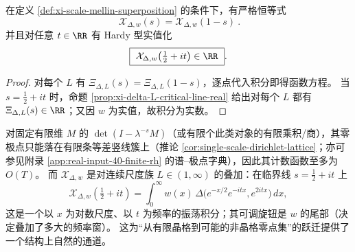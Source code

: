 \begin{proposition}[尺度叠加保持函数方程与临界线实值性]\label{prop:xi-scale-mellin-fe-real}
在定义 \ref{def:xi-scale-mellin-superposition} 的条件下，有严格恒等式
\[
\boxed{\ \mathcal X_{\Delta,w}(s)=\mathcal X_{\Delta,w}(1-s)\ }.
\]
并且对任意 \(t\in\RR\) 有 Hardy 型实值化
\[
\boxed{\ \mathcal X_{\Delta,w}\!\left(\tfrac12+it\right)\in\RR\ }.
\]
\end{proposition}
\begin{proof}
对每个 \(L\) 有 \(\Xi_{\Delta,L}(s)=\Xi_{\Delta,L}(1-s)\)，逐点代入积分即得函数方程。
当 \(s=\tfrac12+it\) 时，命题 \ref{prop:xi-delta-L-critical-line-real} 给出对每个 \(L\) 都有 \(\Xi_{\Delta,L}(s)\in\RR\)；又因 \(w\) 为实值，故积分为实数。
\end{proof}

\begin{remark}[动机：连续尺度混合打破有限竖向晶格刚性]\label{rem:xi-scale-mellin-break-lattice}
对固定有限维 \(M\) 的 \(\det(I-\lambda^{-s}M)\)（或有限个此类对象的有限乘积/商），其零极点只能落在有限条等差竖线簇上（推论 \ref{cor:single-scale-dirichlet-lattice}；亦可参见附录 \ref{app:real-input-40-finite-rh} 的谱--极点字典），因此其计数函数至多为 \(O(T)\)。
而 \(\mathcal X_{\Delta,w}\) 是对连续尺度族 \(L\in(1,\infty)\) 的叠加：在临界线 \(s=\tfrac12+it\) 上
\[
\mathcal X_{\Delta,w}\!\left(\tfrac12+it\right)=\int_0^\infty w(x)\,\Delta\!\bigl(e^{-x/2}e^{-itx},e^{2itx}\bigr)\,dx,
\]
这是一个以 \(x\) 为对数尺度、以 \(t\) 为频率的振荡积分；其可调旋钮是 \(w\) 的尾部（决定叠加了多大的频率窗）。
这为“从有限晶格到可能的非晶格零点集”的跃迁提供了一个结构上自然的通道。
\end{remark}

